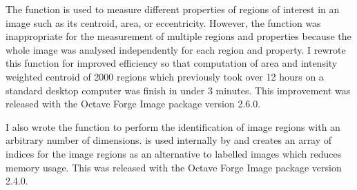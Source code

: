 The function  is used to measure different
properties of regions of interest in an image such as its centroid,
area, or eccentricity.  However, the function was inappropriate for
the measurement of multiple regions and properties because the whole
image was analysed independently for each region and property.  I rewrote
this function for improved efficiency so that
computation of area and intensity weighted
centroid of 2000 regions which previously took over 12 hours on a
standard desktop computer was finish in under 3 minutes.
This improvement was released with the Octave Forge Image package version 2.6.0.

I also wrote the function  to perform the
identification of image regions with an arbitrary number of
dimensions.
 is used internally by  and
creates an array of indices for the image regions as an
alternative to labelled images which reduces memory usage.
This was released with the Octave Forge Image
package version 2.4.0.


